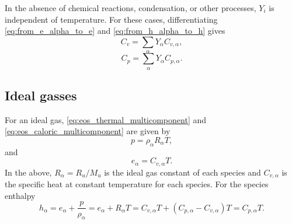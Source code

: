 \documentclass[oneside,a4paper,11pt]{report}
\begin{document}
In the absence of chemical reactions, condensation, or other processes, $Y_i$ is independent of temperature. For these cases, differentiating \cref{eq:from_e_alpha_to_e} and \cref{eq:from_h_alpha_to_h} gives
\begin{equation}
    C_v = \sum_\alpha Y_\alpha C_{v,\alpha},
\end{equation}
\begin{equation}
    C_p = \sum_\alpha Y_\alpha C_{p,\alpha}.
\end{equation}

\subsection{Ideal gasses}
For an ideal gas, \cref{eq:eos_thermal_multicomponent} and \cref{eq:eos_caloric_multicomponent} are given by
\begin{equation}
\label{eq:eos_thermal_multicomponent_ideal}
p = \rho_\alpha R_\alpha T,
\end{equation}
and
\begin{equation} 
\label{eq:eos_caloric_multicomponent_ideal}
e_\alpha = C_{v,\alpha} T .
\end{equation}
In the above, $R_\alpha = R_u / M_u$ is the ideal gas constant of each species and $C_{v,\alpha}$ is the specific heat at constant temperature for each species. For the species enthalpy 
\begin{equation}
    h_\alpha = e_\alpha + \frac{p}{\rho_\alpha} = e_\alpha + R_\alpha T = C_{v,\alpha} T + \left ( C_{p,\alpha} - C_{v,\alpha} \right ) T = C_{p,\alpha} T.
\end{equation}
\end{document}
